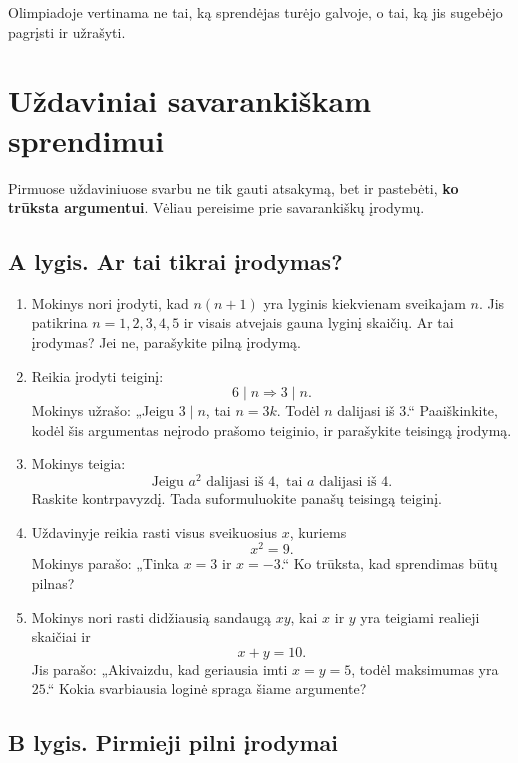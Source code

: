\documentclass[11pt,a4paper]{scrartcl}
\begin{document}
Olimpiadoje vertinama ne tai, ką sprendėjas turėjo galvoje, o tai, ką jis
sugebėjo pagrįsti ir užrašyti.

\section{Uždaviniai savarankiškam sprendimui}

Pirmuose uždaviniuose svarbu ne tik gauti atsakymą, bet ir pastebėti,
\textbf{ko trūksta argumentui}. Vėliau pereisime prie savarankiškų
įrodymų.

\subsection{A lygis. Ar tai tikrai įrodymas?}

\begin{enumerate}
    \renewcommand{\labelenumi}{\textbf{\theenumi.}}

    \item Mokinys nori įrodyti, kad $n(n+1)$ yra lyginis kiekvienam
    sveikajam $n$. Jis patikrina $n=1,2,3,4,5$ ir visais atvejais gauna
    lyginį skaičių.
    Ar tai įrodymas? Jei ne, parašykite pilną įrodymą.

    \item Reikia įrodyti teiginį:
    \[
    6\mid n\Longrightarrow 3\mid n.
    \]
    Mokinys užrašo: „Jeigu $3\mid n$, tai $n=3k$. Todėl $n$ dalijasi iš
    $3$.“
    Paaiškinkite, kodėl šis argumentas neįrodo prašomo teiginio, ir
    parašykite teisingą įrodymą.

    \item Mokinys teigia:
    \[
    \text{Jeigu }a^2\text{ dalijasi iš }4,\text{ tai }a\text{ dalijasi iš }4.
    \]
    Raskite kontrpavyzdį. Tada suformuluokite panašų teisingą teiginį.

    \item Uždavinyje reikia rasti visus sveikuosius $x$, kuriems
    \[
    x^2=9.
    \]
    Mokinys parašo: „Tinka $x=3$ ir $x=-3$.“
    Ko trūksta, kad sprendimas būtų pilnas?

    \item Mokinys nori rasti didžiausią sandaugą $xy$, kai $x$ ir $y$
    yra teigiami realieji skaičiai ir
    \[
    x+y=10.
    \]
    Jis parašo: „Akivaizdu, kad geriausia imti $x=y=5$, todėl maksimumas
    yra $25$.“
    Kokia svarbiausia loginė spraga šiame argumente?
\end{enumerate}

\subsection{B lygis. Pirmieji pilni įrodymai}
\end{document}
